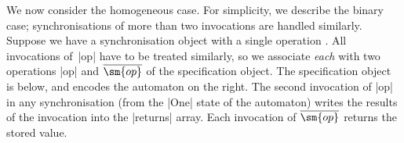 
We now consider the homogeneous case.  For simplicity, we describe the binary
case; synchronisations of more than two invocations are handled similarly.
Suppose we have a synchronisation object with a single operation 
.
All invocations of~|op| have to be treated similarly, so we associate
\emph{each} with two operations |op| and $\overline{\sm{op}}$ of the
specification object.  The specification object is below, and encodes the
automaton on the right.
%
The second invocation of |op| in any synchronisation (from the |One| state of the
automaton) writes the results of the invocation into the |returns| array.
Each invocation of $\overline{\sm{op}}$ returns the stored value.

